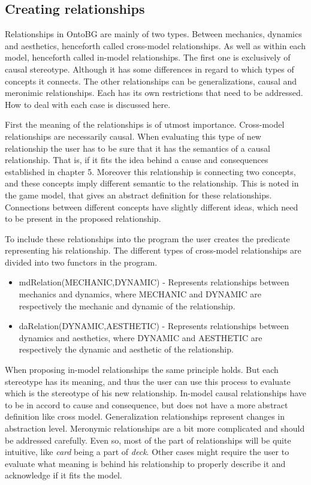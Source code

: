 \subsection{Creating relationships}

Relationships in OntoBG are mainly of two types. Between mechanics, dynamics and aesthetics, henceforth called cross-model relationships. As well as within each model, henceforth called in-model relationships. The first one is exclusively of causal stereotype. Although it has some differences in regard to which types of concepts it connects. The other relationships can be generalizations, causal and meronimic relationships. Each has its own restrictions that need to be addressed. How to deal with each case is discussed here.

First the meaning of the relationships is of utmost importance. Cross-model relationships are necessarily causal. When evaluating this type of new relationship the user has to be sure that it has the semantics of a causal relationship. That is, if it fits the idea behind a cause and consequences established in chapter 5. Moreover this relationship is connecting two concepts, and these concepts imply different semantic to the relationship. This is noted in the game model, that gives an abstract definition for these relationships. Connections between different concepts have slightly different ideas, which need to be present in the proposed relationship.

To include these relationships into the program the user creates the predicate representing his relationship. The different types of cross-model relationships are divided into two functors in the program.
\begin{itemize}
    \item mdRelation(MECHANIC,DYNAMIC) - Represents relationships between mechanics and dynamics, where MECHANIC and DYNAMIC are respectively the mechanic and dynamic of the relationship.
    \item daRelation(DYNAMIC,AESTHETIC) - Represents relationships between dynamics and aesthetics, where DYNAMIC and AESTHETIC are respectively the dynamic and aesthetic of the relationship.
\end{itemize}

When proposing in-model relationships the same principle holds. But each stereotype has its meaning, and thus the user can use this process to evaluate which is the stereotype of his new relationship. In-model causal relationships have to be in accord to cause and consequence, but does not have a more abstract definition like cross model. Generalization relationships represent changes in abstraction level. Meronymic relationships are a bit more complicated and should be addressed carefully. Even so, most of the part of relationships will be quite intuitive, like \textit{card} being a part of \textit{deck}. Other cases might require the user to evaluate what meaning is behind his relationship to properly describe it and acknowledge if it fits the model.

